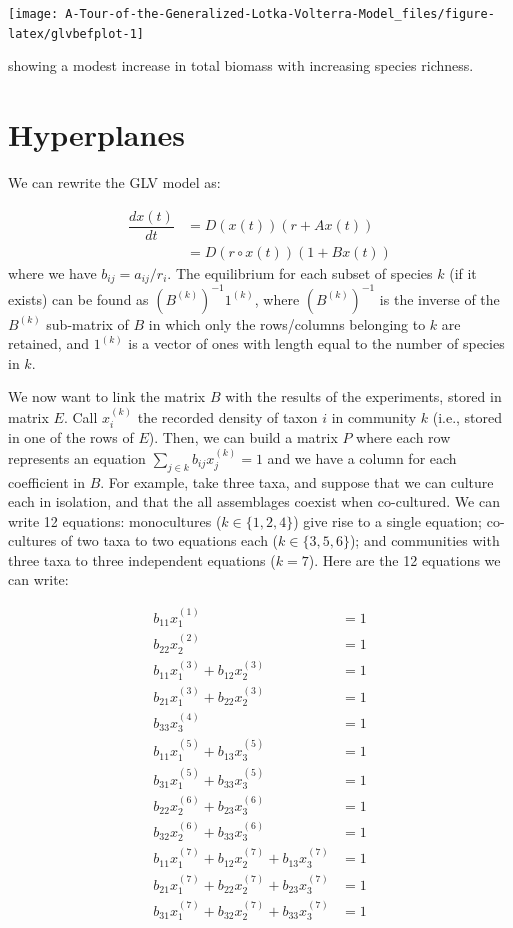\documentclass[]{book}
\begin{document}
\begin{center}\texttt{[image: A-Tour-of-the-Generalized-Lotka-Volterra-Model\_files/figure-latex/glvbefplot-1]} \end{center}

showing a modest increase in total biomass with increasing species richness.

\hypertarget{hyperplanes}{%
\section{Hyperplanes}\label{hyperplanes}}

We can rewrite the GLV model as:

\[
\begin{aligned}
\dfrac{dx(t)}{dt} &= D(x(t))(r + A x(t))\\
&= D(r \circ x(t))(1 + B x(t))
\end{aligned}
\]
where we have \(b_{ij} = a_{ij} / r_i\). The equilibrium for each subset of species \(k\) (if it exists) can be found as \((B^{(k)})^{-1} 1^{(k)}\), where \((B^{(k)})^{-1}\) is the inverse of the \(B^{(k)}\) sub-matrix of \(B\) in which only the rows/columns belonging to \(k\) are retained, and \(1^{(k)}\) is a vector of ones with length equal to the number of species in \(k\).

We now want to link the matrix \(B\) with the results of the experiments, stored in matrix \(E\). Call \(x^{(k)}_i\) the recorded density of taxon \(i\) in community \(k\) (i.e., stored in one of the rows of \(E\)). Then, we can build a matrix \(P\) where each row represents an equation \(\sum_{j \in k} b_{ij} x_j^{(k)} = 1\) and we have a column for each coefficient in \(B\). For example, take three taxa, and suppose that we can culture each in isolation, and that the all assemblages coexist when co-cultured. We can write 12 equations: monocultures (\(k \in \{1, 2, 4\}\)) give rise to a single equation; co-cultures of two taxa to two equations each (\(k \in \{3, 5, 6 \}\)); and communities with three taxa to three independent equations (\(k = 7\)). Here are the 12 equations we can write:

\[
\begin{aligned}
b_{11} x_1^{(1)} &= 1\\
b_{22} x_2^{(2)} &= 1\\
b_{11} x_1^{(3)} + b_{12}x_2^{(3)} &= 1\\
b_{21} x_1^{(3)} + b_{22}x_2^{(3)} &= 1\\
b_{33} x_3^{(4)} &= 1\\
b_{11} x_1^{(5)} + b_{13} x_3^{(5)} &= 1\\
b_{31} x_1^{(5)} + b_{33} x_3^{(5)} &= 1\\
b_{22} x_2^{(6)} + b_{23} x_3^{(6)} &= 1\\
b_{32} x_2^{(6)} + b_{33} x_3^{(6)} &= 1\\
b_{11} x_1^{(7)} + b_{12} x_2^{(7)} + b_{13} x_3^{(7)} & = 1\\
b_{21} x_1^{(7)} + b_{22} x_2^{(7)} + b_{23} x_3^{(7)} & = 1\\
b_{31} x_1^{(7)} + b_{32} x_2^{(7)} + b_{33} x_3^{(7)} & = 1
\end{aligned}
\]
\end{document}
